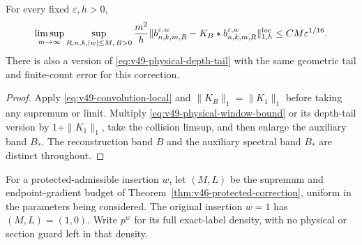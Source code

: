 \begin{corollary}
\label{cor:v49-physical-all-band}
For every fixed $\varepsilon,h>0$,
\begin{equation}\label{eq:v49-physical-all-band}
 \limsup_{m\to\infty}\sup_{R,n,k,|w|\le M,\,B>0}
 \frac{m^2}{h}\|b^{\varepsilon,w}_{n,k,m,R}
                -K_B*b^{\varepsilon,w}_{n,k,m,R}\|_{1,h}^{\rm loc}
                                 \le CM\varepsilon^{1/16}.
\end{equation}
There is also a version of \eqref{eq:v49-physical-depth-tail} with
the same geometric tail and finite-count error for this correction.
\end{corollary}
\begin{proof}
Apply \eqref{eq:v49-convolution-local} and
$\|K_B\|_1=\|K_1\|_1$ before taking any supremum or limit. Multiply
\eqref{eq:v49-physical-window-bound} or its depth-tail version by
$1+\|K_1\|_1$, take the collision limsup, and then enlarge the
auxiliary band $B_*$. The reconstruction band $B$ and the auxiliary
spectral band $B_*$ are distinct throughout.
\end{proof}

For a protected-admissible insertion $w$, let $(M,L)$ be the supremum
and endpoint-gradient budget of
Theorem~\ref{thm:v46-protected-correction}, uniform in the parameters
being considered. The original insertion $w=1$ has $(M,L)=(1,0)$.
Write $p^w$ for its full exact-label density, with no physical or
section guard left in that density.

